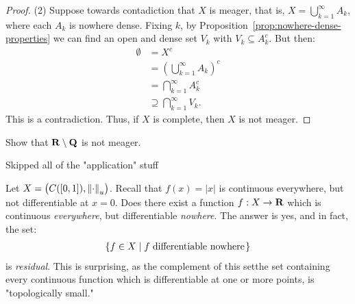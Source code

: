 \begin{proof}
            (2) Suppose towards contadiction that $X$ is meager, that is, $X = \bigcup_{k = 1}^\infty A_k$, where each $A_k$ is nowhere dense. Fixing $k$, by Proposition~\ref{prop:nowhere-dense-properties} we can find an open and dense set $V_k$ with $V_k \subseteq A_k^c$. But then:
                \begin{equation*}
                \begin{split}
                    \emptyset
                    & = X^c \\
                    & = \left( \bigcup_{k = 1}^\infty A_k \right)^c \\
                    & = \bigcap_{k = 1}^\infty A_k^c \\
                    & \supseteq \bigcap_{k = 1}^\infty V_k.
                \end{split}
                \end{equation*}
            This is a contradiction. Thus, if $X$ is complete, then $X$ is not meager.
        \end{proof}

    \begin{exercise}
        Show that $\bfR\setminus \bfQ$ is not meager.
    \end{exercise}

    \vspace{5pt}
    \begin{center}
        {Skipped all of the "application" stuff}
    \end{center}
    \vspace{5pt}

    \begin{example}
        Let $X = \bigl(C([0,1]),\lnorm \cdot \rnorm_u\bigr)$. Recall that $f(x) = |x|$ is continuous everywhere, but not differentiable at $x = 0$. Does there exist a function $f:X \rightarrow \bfR$ which is continuous \textit{everywhere}, but differentiable \textit{nowhere}. The answer is yes, and in fact, the set:
            \begin{equation*}
            \begin{split}
                \left\{ f \in X \mid f \h3\text{differentiable nowhere}\h1 \right\}
            \end{split}
            \end{equation*}
        is \textit{residual}. This is surprising, as the complement of this set\textemdash the set containing every continuous function which is differentiable at one or more points, is "topologically small."
    \end{example}

